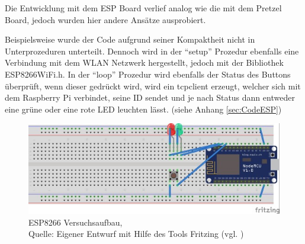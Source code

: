 Die Entwicklung mit dem ESP Board verlief analog wie die mit dem Pretzel Board, jedoch wurden hier andere Ansätze ausprobiert.

Beispielsweise wurde der Code aufgrund seiner Kompaktheit nicht in Unterprozeduren unterteilt.
Dennoch wird in der "`setup"' Prozedur ebenfalls eine Verbindung mit dem \ac{WLAN} Netzwerk hergestellt, jedoch mit der Bibliothek ESP8266WiFi.h.
In der "`loop"' Prozedur wird ebenfalls der Status des Buttons überprüft, wenn dieser gedrückt wird, wird ein tcpclient erzeugt, welcher sich mit dem Raspberry Pi verbindet, seine ID sendet und je nach Status dann entweder eine grüne oder eine rote LED leuchten lässt.
(siehe Anhang \ref{sec:CodeESP})
\begin{figure}[H]
	\centering
	\includegraphics[scale=1.5]{ESP_Fritzing.jpg}
	\caption[ESP8266 Versuchsaufbau]{ESP8266 Versuchsaufbau,\\ Quelle: Eigener Entwurf mit Hilfe des Tools Fritzing (vgl. \cite{.fritz})}
\end{figure}